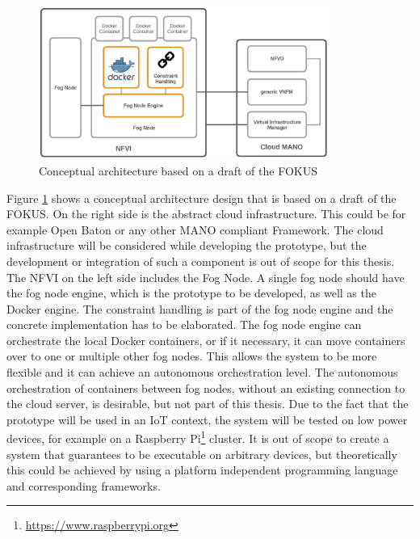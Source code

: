 \begin{figure}[H]
    \centering
    \includegraphics[width=0.85\textwidth]{resources/images/conceptual_architecture.png}
    \caption[Conceptual architecture based on a draft of the \ac{FOKUS}]{Conceptual architecture based on a draft of the FOKUS}
    \label{fig:conceptual_architecture}
\end{figure}

Figure \ref{fig:conceptual_architecture} shows a conceptual architecture design that is based on a draft of the \ac{FOKUS}.
On the right side is the abstract cloud infrastructure.
This could be for example Open Baton or any other \ac{MANO} compliant Framework.
The cloud infrastructure will be considered while developing the prototype, but the development or integration of such a component is out of scope for this thesis.
The \ac{NFVI} on the left side includes the Fog Node.
A single fog node should have the fog node engine, which is the prototype to be developed, as well as the Docker engine.
The constraint handling is part of the fog node engine and the concrete implementation has to be elaborated.
The fog node engine can orchestrate the local Docker containers, or if it necessary, it can move containers over to one or multiple other fog nodes.
This allows the system to be more flexible and it can achieve an autonomous orchestration level.
The autonomous orchestration of containers between fog nodes, without an existing connection to the cloud server, is desirable, but not part of this thesis.
Due to the fact that the prototype will be used in an \ac{IoT} context, the system will be tested on low power devices, for example on a Raspberry Pi\footnote{\url{https://www.raspberrypi.org}} cluster.
It is out of scope to create a system that guarantees to be executable on arbitrary devices, but theoretically this could be achieved by using a platform independent programming language and corresponding frameworks.


